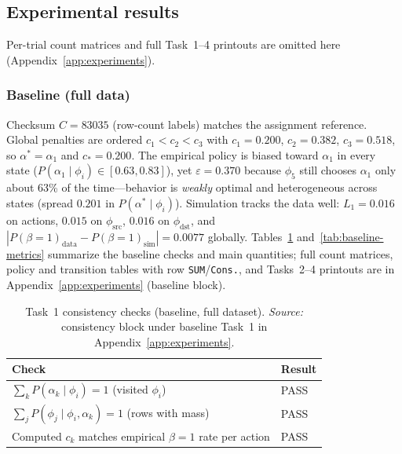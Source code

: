 \documentclass[11pt,a4paper]{article}
\begin{document}
\subsection{Experimental results}\label{sec:exp-results}

Per-trial count matrices and full Task~1--4 printouts are omitted here
(Appendix~\ref{app:experiments}).

\subsubsection{Baseline (full data)}\label{sec:baseline-results}

Checksum $C=83035$ (row-count labels) matches the assignment reference. Global penalties
are ordered $c_1<c_2<c_3$ with $c_1=0.200$, $c_2=0.382$, $c_3=0.518$, so
$\alpha^\ast=\alpha_1$ and $c_\ast=0.200$. The empirical policy is biased toward
$\alpha_1$ in every state ($P(\alpha_1\mid\phi_i)\in[0.63,0.83]$), yet
$\varepsilon=0.370$ because $\phi_5$ still chooses $\alpha_1$ only about 63\% of
the time---behavior is \emph{weakly} optimal and heterogeneous across states
(spread $0.201$ in $P(\alpha^\ast\mid\phi_i)$). Simulation tracks the data well:
$L_1=0.016$ on actions, $0.015$ on $\phi_{\mathrm{src}}$, $0.016$ on
$\phi_{\mathrm{dst}}$, and
$|P(\beta{=}1)_{\mathrm{data}}-P(\beta{=}1)_{\mathrm{sim}}|=0.0077$ globally.
Tables~\ref{tab:baseline-consistency} and~\ref{tab:baseline-metrics} summarize the
baseline checks and main quantities; full count matrices, policy and transition
tables with row \texttt{SUM}/\texttt{Cons.}, and Tasks~2--4 printouts are in
Appendix~\ref{app:experiments} (baseline block).

\begin{table}[htbp]
  \centering
  \caption{Task~1 consistency checks (baseline, full dataset).%
    \newline\emph{Source:} consistency block under baseline Task~1 in
    Appendix~\ref{app:experiments}.}
  \label{tab:baseline-consistency}
  \begin{tabular}{@{}ll@{}}
    \toprule
    \textbf{Check} & \textbf{Result} \\
    \midrule
    $\sum_k P(\alpha_k \mid \phi_i) = 1$ (visited $\phi_i$) & PASS \\
    $\sum_j P(\phi_j \mid \phi_i, \alpha_k) = 1$ (rows with mass) & PASS \\
    Computed $c_k$ matches empirical $\beta{=}1$ rate per action & PASS \\
    \bottomrule
  \end{tabular}
\end{table}
\end{document}
